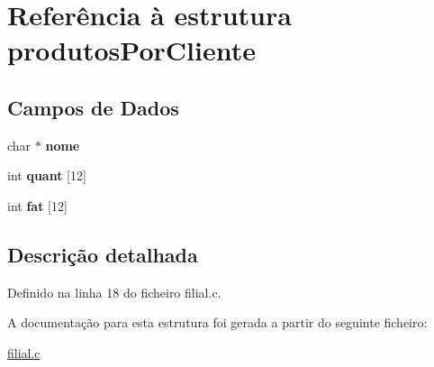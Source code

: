 \hypertarget{structprodutosPorCliente}{}\section{Referência à estrutura produtos\+Por\+Cliente}
\label{structprodutosPorCliente}
\subsection*{Campos de Dados}
\begin{DoxyCompactItemize}
\item 
\mbox{\label{structprodutosPorCliente_a73a3d29e8fd890012b5efb69b01aa362}} 
char $\ast$ {\bfseries nome}
\item 
\mbox{\label{structprodutosPorCliente_a80af2e5b64b9c1cf14d79b0d75bf1d74}} 
int {\bfseries quant} \mbox{[}12\mbox{]}
\item 
\mbox{\label{structprodutosPorCliente_a59f56c877170ccc26db5168b28647962}} 
int {\bfseries fat} \mbox{[}12\mbox{]}
\end{DoxyCompactItemize}


\subsection{Descrição detalhada}


Definido na linha 18 do ficheiro filial.\+c.



A documentação para esta estrutura foi gerada a partir do seguinte ficheiro\+:\begin{DoxyCompactItemize}
\item 
\hyperlink{filial_8c}{filial.\+c}\end{DoxyCompactItemize}

